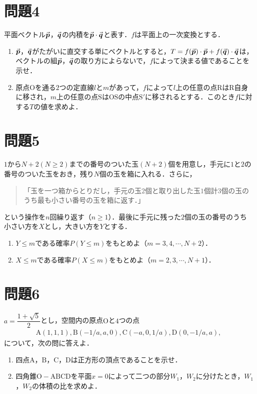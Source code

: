 \documentclass[unicode,12pt, A4j]{ltjsarticle}%
\begin{document}
\section{問題4}
平面ベクトル$\va*{p}$，$\va*{q}$の内積を$\va*{p}\cdot\va*{q}$と表す．$f$は平面上の一次変換とする．

\begin{enumerate}
 \item $\va*{p}$，$\va*{q}$がたがいに直交する単にベクトルとすると，$T=f(\va*{p})\cdot\va*{p}+f(\va*{q})\cdot\va*{q}$は，ベクトルの組$\va*{p}$，$\va*{q}$の取り方によらないで，$f$によって決まる値であることを示せ．
 \item 原点$\mathrm{O}$を通る$2$つの定直線$l$と$m$があって，$f$によって$l$上の任意の点$\mathrm{R}$は$\mathrm{R}$自身に移され，$m$上の任意の点$\mathrm{S}$は$\mathrm{OS}$の中点$\mathrm{S}'$に移されるとする．このとき$f$に対する$T$の値を求めよ．
\end{enumerate}

\section{問題5}
$1$から$N+2 (N\ge 2)$までの番号のついた玉$(N+2)$個を用意し，手元に$1$と$2$の番号のついた玉をおき，残り$N$個の玉を箱に入れる．さらに，
\begin{quote}
 「玉を一つ箱からとりだし，手元の玉$2$個と取り出した玉$1$個計$3$個の玉のうち最も小さい番号の玉を箱に返す．」
\end{quote}
という操作を$n$回繰り返す（$n\ge 1$）．最後に手元に残った$2$個の玉の番号のうち小さい方を$X$とし，大きい方を$Y$とする．
\begin{enumerate}
 \item $Y\le m$である確率$P (Y\le m)$をもとめよ（$m=3,4,\cdots, N+2$）．
 \item $X\le m$である確率$P (X\le m)$をもとめよ（$m=2,3,\cdots, N+1$）．
\end{enumerate}


\section{問題6}
$ a=\dfrac{1+\sqrt{5}}{2}$とし，空間内の原点$\mathrm{O}$と$4$つの点
\begin{align*}
 \mathrm{A}(1,1,1), \mathrm{B}(-1/a,a,0),\mathrm{C}(-a,0,1/a),\mathrm{D}(0,-1/a,a),
\end{align*}
について，次の問に答えよ．
\begin{enumerate}
 \item 四点$\mathrm{A}$，$\mathrm{B}$，$\mathrm{C}$，$\mathrm{D}$は正方形の頂点であることを示せ．
 \item 四角錐$\mathrm{O-ABCD}$を平面$x=0$によって二つの部分$W_1$，$W_2$に分けたとき，$W_1$，$W_2$の体積の比を求めよ．
\end{enumerate}
\end{document}
